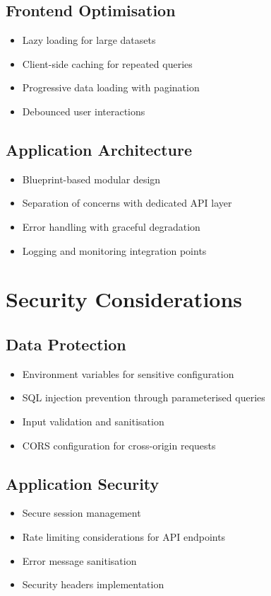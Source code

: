 \documentclass[12pt,a4paper]{article}
\begin{document}
\subsection{Frontend Optimisation}
\begin{itemize}
    \item Lazy loading for large datasets
    \item Client-side caching for repeated queries
    \item Progressive data loading with pagination
    \item Debounced user interactions
\end{itemize}

\subsection{Application Architecture}
\begin{itemize}
    \item Blueprint-based modular design
    \item Separation of concerns with dedicated API layer
    \item Error handling with graceful degradation
    \item Logging and monitoring integration points
\end{itemize}

\section{Security Considerations}

\subsection{Data Protection}
\begin{itemize}
    \item Environment variables for sensitive configuration
    \item SQL injection prevention through parameterised queries
    \item Input validation and sanitisation
    \item CORS configuration for cross-origin requests
\end{itemize}

\subsection{Application Security}
\begin{itemize}
    \item Secure session management
    \item Rate limiting considerations for API endpoints
    \item Error message sanitisation
    \item Security headers implementation
\end{itemize}
\end{document}
